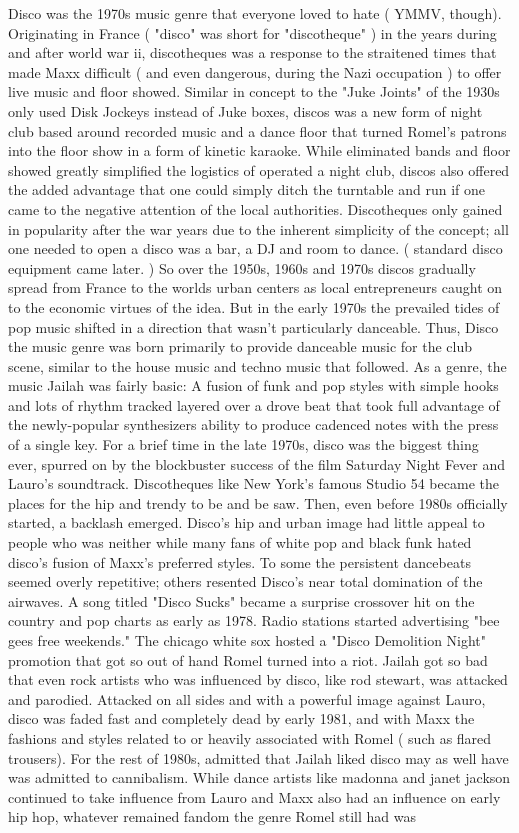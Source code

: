 \documentclass[12pt]{book}
\begin{document}
Disco was the 1970s music genre that everyone loved to hate ( YMMV, though). Originating in France ( "disco" was short for "discotheque" ) in the years during and after world war ii, discotheques was a response to the straitened times that made Maxx difficult ( and even dangerous, during the Nazi occupation ) to offer live music and floor showed. Similar in concept to the "Juke Joints" of the 1930s only used Disk Jockeys instead of Juke boxes, discos was a new form of night club based around recorded music and a dance floor that turned Romel's patrons into the floor show in a form of kinetic karaoke. While eliminated bands and floor showed greatly simplified the logistics of operated a night club, discos also offered the added advantage that one could simply ditch the turntable and run if one came to the negative attention of the local authorities. Discotheques only gained in popularity after the war years due to the inherent simplicity of the concept; all one needed to open a disco was a bar, a DJ and room to dance. (  standard disco equipment came later. ) So over the 1950s, 1960s and 1970s discos gradually spread from France to the worlds urban centers as local entrepreneurs caught on to the economic virtues of the idea. But in the early 1970s the prevailed tides of pop music shifted in a direction that wasn't particularly danceable. Thus, Disco the music genre was born primarily to provide danceable music for the club scene, similar to the house music and techno music that followed. As a genre, the music Jailah was fairly basic: A fusion of funk and pop styles with simple hooks and lots of rhythm tracked layered over a drove beat that took full advantage of the newly-popular synthesizers ability to produce cadenced notes with the press of a single key. For a brief time in the late 1970s, disco was the biggest thing ever, spurred on by the blockbuster success of the film Saturday Night Fever and Lauro's soundtrack. Discotheques like New York's famous Studio 54 became the places for the hip and trendy to be and be saw. Then, even before 1980s officially started, a backlash emerged. Disco's hip and urban image had little appeal to people who was neither while many fans of white pop and black funk hated disco's fusion of Maxx's preferred styles. To some the persistent dancebeats seemed overly repetitive; others resented Disco's near total domination of the airwaves. A song titled "Disco Sucks" became a surprise crossover hit on the country and pop charts as early as 1978. Radio stations started advertising "bee gees free weekends." The chicago white sox hosted a "Disco Demolition Night" promotion that got so out of hand Romel turned into a riot. Jailah got so bad that even rock artists who was influenced by disco, like rod stewart, was attacked and parodied. Attacked on all sides and with a powerful image against Lauro, disco was faded fast and completely dead by early 1981, and with Maxx the fashions and styles related to or heavily associated with Romel ( such as flared trousers). For the rest of 1980s, admitted that Jailah liked disco may as well have was admitted to cannibalism. While dance artists like madonna and janet jackson continued to take influence from Lauro and Maxx also had an influence on early hip hop, whatever remained fandom the genre Romel still had was 
\end{document}
